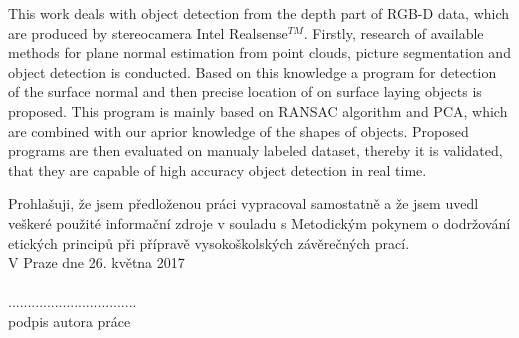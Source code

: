 \begin{abstract-english}
    This work deals with object detection from the depth part of RGB-D data, which are produced by stereocamera Intel\textregistered{} Realsense$^{TM}$. Firstly, research of available methods for plane normal estimation from point clouds, picture segmentation and object detection is conducted. Based on this knowledge a program for detection of the surface normal and then precise location of on surface laying objects is proposed. This program is mainly based on RANSAC algorithm and PCA, which are combined with our aprior knowledge of the shapes of objects. Proposed programs are then evaluated on manualy labeled dataset, thereby it is validated, that they are capable of high accuracy object detection in real time.
\end{abstract-english}
\begin{declaration}
Prohlašuji, že jsem předloženou práci
vypracoval samostatně a že jsem uvedl
veškeré použité informační zdroje v
souladu s Metodickým pokynem o
dodržování etických principů při přípravě
vysokoškolských závěrečných prací. \\
V Praze dne 26. května 2017 \\ \\
.................................\\
podpis autora práce
\end{declaration}

